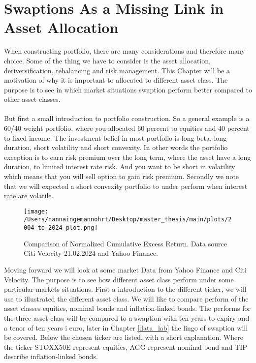 \section{Swaptions As a Missing Link in Asset Allocation}
When constructing portfolio, there are many considerations and therefore many choice. 
Some of the thing we have to consider is the asset allocation, deriversification, rebalancing 
and risk management. This Chapter will be a motivation of why it is important to 
allocated to different asset class. The purpose is to see in which market situations
swaption perform better compared to other asset classes.
\\\\
But first a small introduction to portfolio construction. 
So a general  example is a 60/40 weight portfolio, where you allocated 60 percent to equities 
and 40 percent to fixed income. 
The investment belief in most portfolio is long beta, long duration, short volatility and short 
convexity. In other words the portfolio exception is to earn risk premium over the long term, 
where the asset have a long duration, to limited interest rate risk. And you want to be short in
volatility which means that you will sell option to gain risk premium. Secondly we note that we will expected 
a short convexity portfolio to under perform when interest rate are volatile. 
\begin{figure}[H]
    \centering
    \texttt{[image: /Users/nannaingemannohrt/Desktop/master\_thesis/main/plots/2004\_to\_2024\_plot.png]}
    \caption{Comparison of Normalized Cumulative Excess Return. Data source Citi Velocity 21.02.2024 
    and Yahoo Finance.}
    \label{fig:2004_2024}
\end{figure}
\noindent
Moving forward we will look at some market Data from Yahoo Finance and Citi Velocity. 
The purpose is to see how different asset class perform under some particular markets situations.
First a introduction to the different ticker, we will use to illustrated the different asset class. 
We will like to compare perform of the asset classes equities, nominal bonds and inflation-linked bonds. 
The performs for the three asset class will be compared to a swaption with ten years to expiry and a tenor
of ten years i euro, later in Chapter \ref{data_lab} the lingo of swaption will be covered. 
Below the chosen ticker are listed, with a short explanation. Where the ticker STOXX50E represent equities, 
AGG represent nominal bond and TIP describe inflation-linked bonds.

